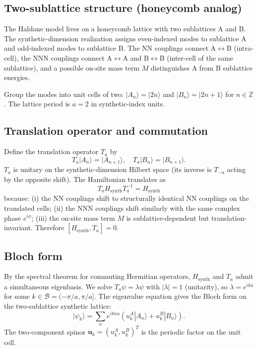 \documentclass[11pt,a4paper]{article}
\begin{document}
\subsection{Two-sublattice structure (honeycomb analog)}

The Haldane model lives on a honeycomb lattice with two sublattices A and B. The synthetic-dimension realization assigns even-indexed modes to sublattice A and odd-indexed modes to sublattice B. The NN couplings connect A$\leftrightarrow$B (intra-cell), the NNN couplings connect A$\leftrightarrow$A and B$\leftrightarrow$B (inter-cell of the same sublattice), and a possible on-site mass term $M$ distinguishes A from B sublattice energies.

Group the modes into unit cells of two: $|A_n\rangle = |2n\rangle$ and $|B_n\rangle = |2n+1\rangle$ for $n \in \mathbb{Z}$. The lattice period is $a = 2$ in synthetic-index units.

\subsection{Translation operator and commutation}

Define the translation operator $T_a$ by
\[
T_a|A_n\rangle = |A_{n+1}\rangle, \quad T_a|B_n\rangle = |B_{n+1}\rangle.
\]
$T_a$ is unitary on the synthetic-dimension Hilbert space (its inverse is $T_{-a}$ acting by the opposite shift). The Hamiltonian translates as
\[
T_a H_{\mathrm{synth}} T_a^{-1} = H_{\mathrm{synth}}
\]
because: (i) the NN couplings shift to structurally identical NN couplings on the translated cells; (ii) the NNN couplings shift similarly with the same complex phase $e^{i\phi}$; (iii) the on-site mass term $M$ is sublattice-dependent but translation-invariant. Therefore $[H_{\mathrm{synth}}, T_a] = 0$.

\subsection{Bloch form}

By the spectral theorem for commuting Hermitian operators, $H_{\mathrm{synth}}$ and $T_a$ admit a simultaneous eigenbasis. We solve $T_a\psi = \lambda\psi$ with $|\lambda| = 1$ (unitarity), so $\lambda = e^{ika}$ for some $k \in \mathcal{B} = (-\pi/a, \pi/a]$. The eigenvalue equation gives the Bloch form on the two-sublattice synthetic lattice:
\[
|\psi_k\rangle = \sum_n e^{ikna}(u^A_k|A_n\rangle + u^B_k|B_n\rangle).
\]
The two-component spinor $\mathbf{u}_k = (u^A_k, u^B_k)^T$ is the periodic factor on the unit cell.
\end{document}
